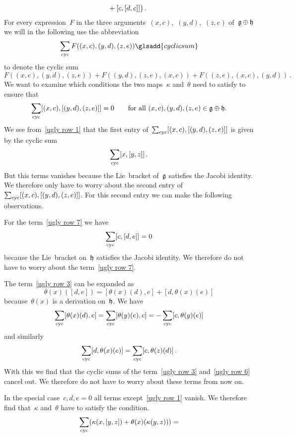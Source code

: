 \begin{fluff}
\begin{enumerate}
\begin{align}
				\\
				{}&
				\hphantom{\bigl(}
					+ [c, [d, c]]
				\bigr) \,.
				\label{ugly row 7}
			\end{align}
			For every expression~$F$ in the three arguments~$(x,c)$,~$(y,d)$,~$(z,e)$ of~$\mathfrak{g} \oplus \mathfrak{h}$ we will in the following use the abbreviation
			\[
				\sum_{\cyc} F( (x,c), (y,d), (z,e) )
				\glsadd{cyclic sum}
			\]
			to denote the cyclic sum
			\[
				F( (x,c), (y,d), (z,e) )
				+ F( (y,d), (z,e), (x,c) )
				+ F( (z,e), (x,c), (y,d) ) \,.
			\]
			We want to examine which conditions the two maps~$\kappa$ and~$\theta$ need to satisfy to ensure that
			\[
				\sum_{\mathrm{cyc}}
				[(x,c), [(y,d), (z,e)]]
				=
				0
				\qquad
				\text{for all~$(x,c), (y,d), (z,e) \in \mathfrak{g} \oplus \mathfrak{h}$.}
			\]
			We see from~\eqref{ugly row 1} that the first entry of~$\sum_{\mathrm{cyc}} [(x,c), [(y,d), (z,e)]]$ is given by the cyclic sum
			\[
				\sum_{\mathrm{cyc}} [x,[y,z]] \,.
			\]
			But this terms vanishes because the Lie~bracket of~$\mathfrak{g}$ satisfies the Jacobi identity.
			We therefore only have to worry about the second entry of~$\sum_{\mathrm{cyc}} [(x,c), [(y,d), (z,e)]]$.
			For this second entry we can make the following observations.
\end{enumerate}
\end{fluff}
